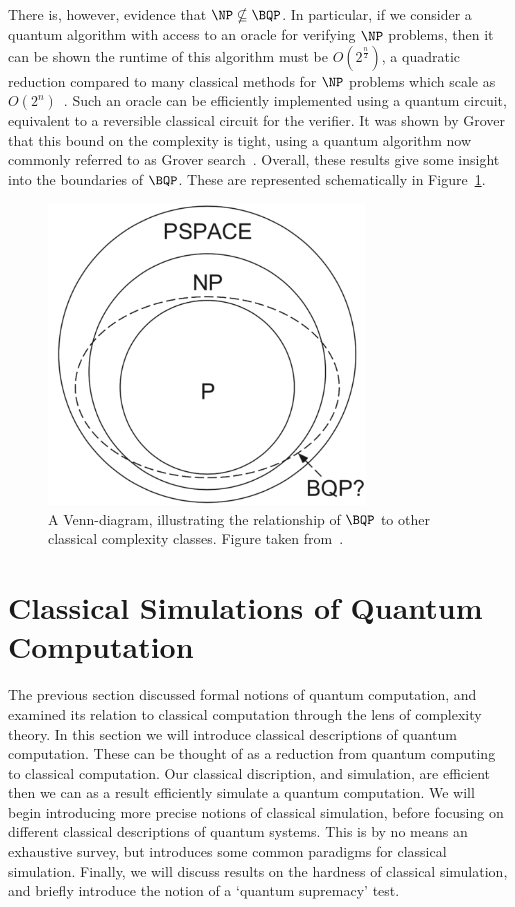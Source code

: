 There is, however, evidence that $\NP\nsubseteq \BQP$. In particular, if we consider a quantum algorithm with access to an oracle for verifying $\NP$ problems, then it can be shown the runtime of this algorithm must be $O\left(2^{\frac{n}{2}}\right)$, a quadratic reduction compared to many classical methods for $\NP$ problems which scale as $O\left(2^{n}\right)$~\cite{Bennett1997}. Such an oracle can be efficiently implemented using a quantum circuit, equivalent to a reversible classical circuit for the verifier. It was shown by Grover that this bound on the complexity is tight, using a quantum algorithm now commonly referred to as Grover search~\cite{Grover1996}. Overall, these results give some insight into the boundaries of $\BQP$. These are represented schematically in Figure~\ref{fig:bqp_venn}.
\begin{figure}
\centering
\includegraphics[width=0.75\textwidth]{Figures/BQP_diagram.png}
\caption{A Venn-diagram, illustrating the relationship of $\BQP$ to other classical complexity classes. Figure taken from~\cite{Nielsen2000}.}\label{fig:bqp_venn}
\end{figure}
\section{Classical Simulations of Quantum Computation}\label{sec:intro_classical_simulation}
The previous section discussed formal notions of quantum computation, and examined its relation to classical computation through the lens of complexity theory. In this section we will introduce classical descriptions of quantum computation. These can be thought of as a reduction from quantum computing to classical computation. Our classical discription, and simulation, are efficient then we can as a result efficiently simulate a quantum computation. We will begin introducing more precise notions of classical simulation, before focusing on different classical descriptions of quantum systems. This is by no means an exhaustive survey, but introduces some common paradigms for classical simulation. Finally, we will discuss results on the hardness of classical simulation, and briefly introduce the notion of a `quantum supremacy' test.
